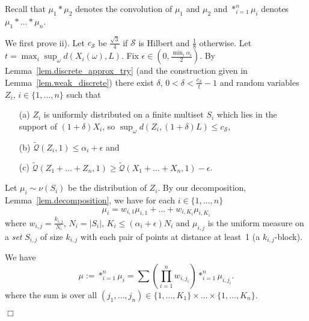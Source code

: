 \documentclass{article}
\newenvironment{proofof}[1]{\noindent {\bf Proof of #1}}{\hspace*{\fill}$\Box$}
\newcommand{\concdiam}{\tilde{\mathcal{Q}}}
\begin{document}
Recall that $\mu_1 * \mu_2$ denotes the convolution of $\mu_1$ and $\mu_2$ and $*_{i=1}^n \mu_i$ denotes $\mu_1 * \dots * \mu_n$.

\medskip

\begin{proofof}{Theorem~\ref{close_to_line}}
    We first prove ii). 
    Let $c_{\mathcal S}$ be $\frac{\sqrt 3} 4$ if $\mathcal{S}$ is Hilbert and $\frac 1 8$ otherwise. Let $t = \max_i \sup_\omega d(X_i(\omega), L)$. Fix $\epsilon \in (0, \frac {\min_i \alpha_i} 2)$. By Lemma~\ref{lem.discrete_approx_try} (and the construction given in Lemma~\ref{lem.weak_discrete}) 
there exist $\delta$, $0 < \delta < \frac {c_{\mathcal{S}}} {t} - 1$ and random variables $Z_i$, $i \in \{1, \dots, n\}$ such that 
    \begin{enumerate}
        \item[(a)] $Z_i$ is uniformly distributed on a finite multiset $S_i$ which lies in the support of $(1+\delta)X_i$, so  $\sup_\omega d(Z_i, (1+\delta)L) \le c_{\mathcal{S}}$,
        \item[(b)] $\concdiam(Z_i,1) \le \alpha_i +  \epsilon$ and
        \item[(c)] $\concdiam(Z_1 + \dots + Z_n, 1) \ge \concdiam(X_1 + \dots + X_n, 1) - \epsilon$.
\end{enumerate}            
    Let $\mu_i \sim \nu(S_i)$ be the distribution of $Z_i$.
    By our decomposition, Lemma~\ref{lem.decomposition}, we have for each $i \in \{1, \dots, n\}$
    \[
        \mu_i = w_{i,1} \mu_{i,1} + ... + w_{i,K_i} \mu_{i,K_i}
    \]
    where $w_{i,j} = \frac {k_{i,j}} {N_i}$, $N_i = |S_i|$, $K_i \le (\alpha_i + \epsilon) N_i$ and 
    $\mu_{i,j}$ is the uniform
    measure on a \emph{set} $S_{i,j}$ of size $k_{i,j}$ with each pair of points at distance at least~1 (a $k_{i,j}$-block).

    We have
    \[
        \mu:=*_{i=1}^n \mu_i = \sum \left(\prod_{i=1}^n w_{i,j_i}\right) *_{i=1}^n \mu_{i, j_i}.
    \]
    where the sum is over all $(j_1, \dots, j_n) \in \{1, \dots, K_1\} \times \dots \times \{1, \dots, K_n\}$.


\end{proofof}
\end{document}
